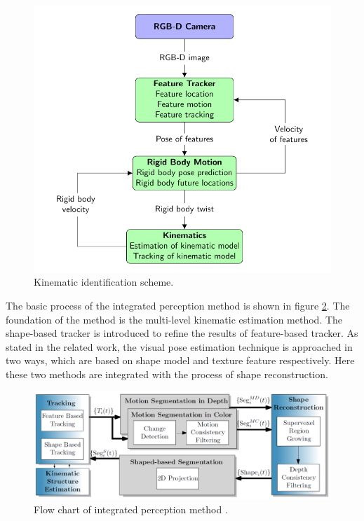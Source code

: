 \documentclass[letterpaper, 10 pt, conference]{ieeeconf}
\begin{document}
\begin{figure}[!h]
	\includegraphics[scale=0.70]{figures/RecursiveEstimation.pdf}
	\centering
	\caption{Kinematic identification scheme.}
	\label{RE}
\end{figure}

The basic process of the integrated perception method is shown in figure \ref{IP}. The foundation of the method is the multi-level kinematic estimation method. The shape-based tracker is introduced to refine the results of feature-based tracker. As stated in the related work, the visual pose estimation technique is approached in two ways, which are based on shape model and texture feature respectively. Here these two methods are integrated with the process of shape reconstruction. 

\begin{figure}[!h]
	\includegraphics[scale=0.315]{figures/IP_method.png}
	\centering
	\caption{Flow chart of integrated perception method \cite{martin2016integrated}.}
	\label{IP}
\end{figure}
\end{document}
